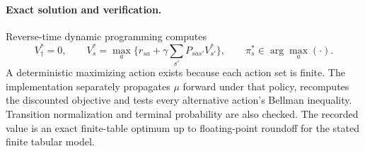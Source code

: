 \documentclass[11pt]{article}
\begin{document}
\paragraph{Exact solution and verification.}
Reverse-time dynamic programming computes
\[
V^*_\dagger=0,\qquad
V^*_s=\max_a\{r_{sa}+\gamma\sum_{s'}P_{sas'}V^*_{s'}\},
\qquad \pi^*_s\in\arg\max_a(\cdot).
\]
A deterministic maximizing action exists because each action set is finite.
The implementation separately propagates $\mu$ forward under that policy,
recomputes the discounted objective and tests every alternative action's
Bellman inequality. Transition normalization and terminal probability are
also checked. The recorded value is an exact finite-table optimum up to
floating-point roundoff for the stated finite tabular model.
\end{document}
